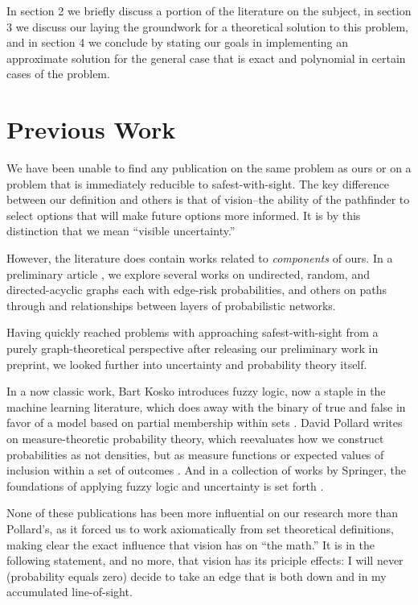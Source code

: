 \documentclass{article}
\begin{document}
In section 2 we briefly discuss a portion of the literature on the
subject, in section 3 we discuss our laying the groundwork for a
theoretical solution to this problem, and in section 4 we conclude by
stating our goals in implementing an approximate solution for the
general case that is exact and polynomial in certain cases of the
problem.

    \section{Previous Work}\label{previous-work}

    We have been unable to find any publication on the same problem as ours
or on a problem that is immediately reducible to safest-with-sight. The
key difference between our definition and others is that of vision--the
ability of the pathfinder to select options that will make future
options more informed. It is by this distinction that we mean ``visible
uncertainty.''

However, the literature does contain works related to \emph{components}
of ours. In a preliminary article \cite{knowles14}, we explore several
works on undirected, random, and directed-acyclic graphs each with
edge-risk probabilities, and others on paths through and relationships
between layers of probabilistic networks.

Having quickly reached problems with approaching safest-with-sight from
a purely graph-theoretical perspective after releasing our preliminary
work in preprint, we looked further into uncertainty and probability
theory itself.

In a now classic work, Bart Kosko introduces fuzzy logic, now a staple
in the machine learning literature, which does away with the binary of
true and false in favor of a model based on partial membership within
sets \cite{kosko93}. David Pollard writes on measure-theoretic
probability theory, which reevaluates how we construct probabilities as
not densities, but as measure functions or expected values of inclusion
within a set of outcomes \cite{pollard01}. And in a collection of works
by Springer, the foundations of applying fuzzy logic and uncertainty is
set forth \cite{springer10}.

None of these publications has been more influential on our research
more than Pollard's, as it forced us to work axiomatically from set
theoretical definitions, making clear the exact influence that vision
has on ``the math.'' It is in the following statement, and no more, that
vision has its priciple effects: I will never (probability equals zero)
decide to take an edge that is both down and in my accumulated
line-of-sight.
\end{document}
